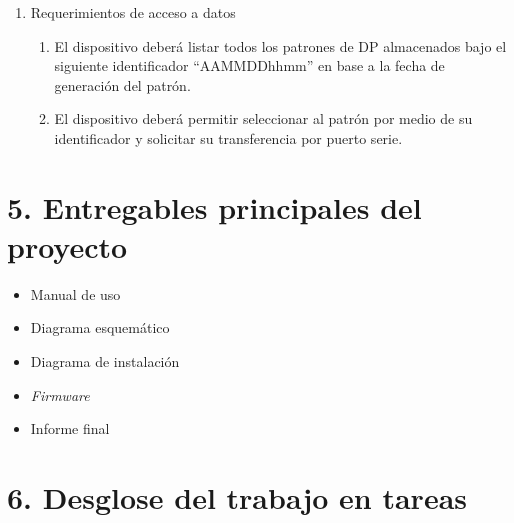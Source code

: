 \documentclass[11pt]{charter}
\begin{document}
\begin{enumerate}
\begin{enumerate}
	\end{enumerate}
\item Requerimientos de acceso a datos
	\begin{enumerate}
	\item El dispositivo deberá listar todos los patrones de DP almacenados bajo el siguiente identificador “AAMMDDhhmm” en base a la fecha de generación del patrón. 
	\item El dispositivo deberá permitir seleccionar al patrón por medio de su identificador y solicitar su transferencia por puerto serie.
	\end{enumerate}

\end{enumerate}

\section{5. Entregables principales del proyecto}
\label{sec:entregables}

\begin{itemize}
\item Manual de uso
\item Diagrama esquemático
\item Diagrama de instalación
\item \textit{Firmware}
\item Informe final

\end{itemize}

\section{6. Desglose del trabajo en tareas}
\label{sec:wbs}
\end{document}
